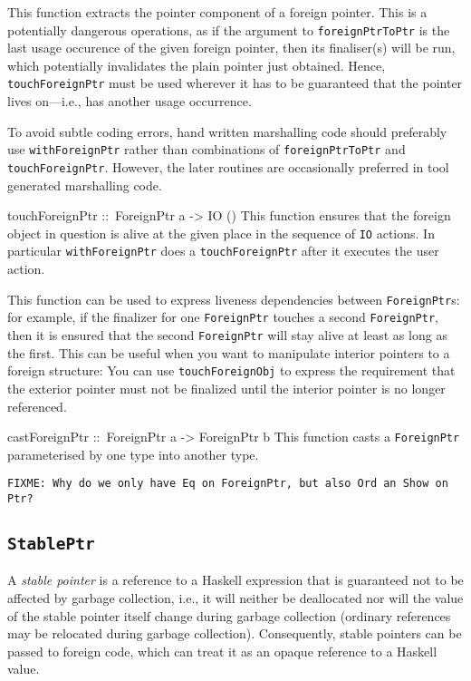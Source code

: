 \documentclass[a4paper,twosides]{article}
\makeatletter
\newcommand{\code}[1]{\texttt{#1}}      %
\newenvironment{codedesc}{%
  \list{}{\labelwidth\z@ %
    \let\makelabel\codedesclabel}
  }{%
  \endlist
  }
\newcommand*{\codedesclabel}[1]{%
  \hspace{-\leftmargin}
  \parbox[b]{\labelwidth}{\makebox[0pt][l]{\code{#1}}\\}\hfil\relax
  }
\makeatother
\begin{document}
\begin{codedesc}
  This function extracts the pointer component of a foreign pointer. This is a
  potentially dangerous operations, as if the argument to
  \code{foreignPtrToPtr} is the last usage occurence of the given foreign
  pointer, then its finaliser(s) will be run, which potentially invalidates
  the plain pointer just obtained.  Hence, \code{touchForeignPtr} must be used
  wherever it has to be guaranteed that the pointer lives on---i.e., has
  another usage occurrence.
  
  To avoid subtle coding errors, hand written marshalling code should
  preferably use \code{withForeignPtr} rather than combinations of
  \code{foreignPtrToPtr} and \code{touchForeignPtr}. However, the later
  routines are occasionally preferred in tool generated marshalling code.
  
\item[touchForeignPtr ::\ ForeignPtr a -> IO ()] This function ensures that
  the foreign object in question is alive at the given place in the sequence
  of \code{IO} actions. In particular \code{withForeignPtr} does a
  \code{touchForeignPtr} after it executes the user action.
  
  This function can be used to express liveness dependencies between
  \code{ForeignPtr}s: for example, if the finalizer for one \code{ForeignPtr}
  touches a second \code{ForeignPtr}, then it is ensured that the second
  \code{ForeignPtr} will stay alive at least as long as the first. This can be
  useful when you want to manipulate interior pointers to a foreign structure:
  You can use \code{touchForeignObj} to express the requirement that the
  exterior pointer must not be finalized until the interior pointer is no
  longer referenced.
    
\item[castForeignPtr ::\ ForeignPtr a -> ForeignPtr b] This function casts a
  \code{ForeignPtr} parameterised by one type into another type.

\end{codedesc}

\begin{verbatim}
FIXME: Why do we only have Eq on ForeignPtr, but also Ord an Show on Ptr?
\end{verbatim}

\subsection{\code{StablePtr}}
\label{sec:StablePtr}

A \emph{stable pointer} is a reference to a Haskell expression that is
guaranteed not to be affected by garbage collection, i.e., it will neither be
deallocated nor will the value of the stable pointer itself change during
garbage collection (ordinary references may be relocated during garbage
collection).  Consequently, stable pointers can be passed to foreign code,
which can treat it as an opaque reference to a Haskell value.
\end{document}
